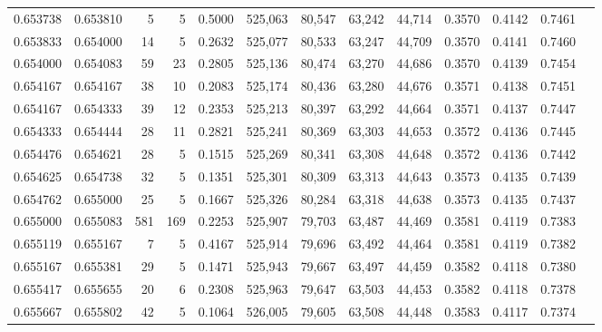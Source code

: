 \begin{tabular}{rrrrrrrrrrrrr}
0.653738 & 0.653810 &     5 &   5 &                                     0.5000 & 525,063 &  80,547 &  63,242 &  44,714 & 0.3570 & 0.4142 & 0.7461 \\
0.653833 & 0.654000 &    14 &   5 &                                     0.2632 & 525,077 &  80,533 &  63,247 &  44,709 & 0.3570 & 0.4141 & 0.7460 \\
0.654000 & 0.654083 &    59 &  23 &                                     0.2805 & 525,136 &  80,474 &  63,270 &  44,686 & 0.3570 & 0.4139 & 0.7454 \\
0.654167 & 0.654167 &    38 &  10 &                                     0.2083 & 525,174 &  80,436 &  63,280 &  44,676 & 0.3571 & 0.4138 & 0.7451 \\
0.654167 & 0.654333 &    39 &  12 &                                     0.2353 & 525,213 &  80,397 &  63,292 &  44,664 & 0.3571 & 0.4137 & 0.7447 \\
0.654333 & 0.654444 &    28 &  11 &                                     0.2821 & 525,241 &  80,369 &  63,303 &  44,653 & 0.3572 & 0.4136 & 0.7445 \\
0.654476 & 0.654621 &    28 &   5 &                                     0.1515 & 525,269 &  80,341 &  63,308 &  44,648 & 0.3572 & 0.4136 & 0.7442 \\
0.654625 & 0.654738 &    32 &   5 &                                     0.1351 & 525,301 &  80,309 &  63,313 &  44,643 & 0.3573 & 0.4135 & 0.7439 \\
0.654762 & 0.655000 &    25 &   5 &                                     0.1667 & 525,326 &  80,284 &  63,318 &  44,638 & 0.3573 & 0.4135 & 0.7437 \\
0.655000 & 0.655083 &   581 & 169 &                                     0.2253 & 525,907 &  79,703 &  63,487 &  44,469 & 0.3581 & 0.4119 & 0.7383 \\
0.655119 & 0.655167 &     7 &   5 &                                     0.4167 & 525,914 &  79,696 &  63,492 &  44,464 & 0.3581 & 0.4119 & 0.7382 \\
0.655167 & 0.655381 &    29 &   5 &                                     0.1471 & 525,943 &  79,667 &  63,497 &  44,459 & 0.3582 & 0.4118 & 0.7380 \\
0.655417 & 0.655655 &    20 &   6 &                                     0.2308 & 525,963 &  79,647 &  63,503 &  44,453 & 0.3582 & 0.4118 & 0.7378 \\
0.655667 & 0.655802 &    42 &   5 &                                     0.1064 & 526,005 &  79,605 &  63,508 &  44,448 & 0.3583 & 0.4117 & 0.7374 \\

\end{tabular}
